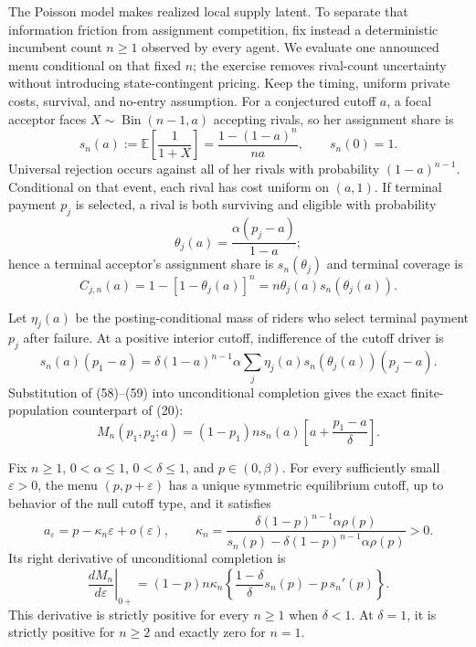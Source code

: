\documentclass[mnsc,blindrev]{informs3}
\newcommand{\E}{\mathbb E}
\begin{document}
The Poisson model makes realized local supply latent.  To separate that
information friction from assignment competition, fix instead a deterministic
incumbent count $n\ge1$ observed by every agent.  We evaluate one announced
menu conditional on that fixed $n$; the exercise removes rival-count
uncertainty without introducing state-contingent pricing.  Keep the timing,
uniform private costs, survival, and no-entry assumption.
For a conjectured cutoff $a$, a focal acceptor faces
$X\sim\operatorname{Bin}(n-1,a)$ accepting rivals, so her assignment share is
\[
 s_n(a):=\E\!\left[\frac1{1+X}\right]
 =\frac{1-(1-a)^n}{na},
 \qquad s_n(0)=1.                                           \tag{57}
\]
Universal rejection occurs against all of her rivals with probability
$(1-a)^{n-1}$.  Conditional on that event, each rival has cost uniform on
$(a,1)$.  If terminal payment $p_j$ is selected, a rival is both surviving
and eligible with probability
\[
 \theta_j(a)=\frac{\alpha(p_j-a)}{1-a};
\]
hence a terminal acceptor's assignment share is $s_n(\theta_j)$ and terminal
coverage is
\[
 C_{j,n}(a)=1-[1-\theta_j(a)]^n
           =n\theta_j(a)s_n(\theta_j(a)).                   \tag{58}
\]

Let $\eta_j(a)$ be the posting-conditional mass of riders who select terminal
payment $p_j$ after failure.  At a positive interior cutoff, indifference of
the cutoff driver is
\[
 s_n(a)(p_1-a)
 =\delta(1-a)^{n-1}\alpha
   \sum_j\eta_j(a)s_n(\theta_j(a))(p_j-a).                  \tag{59}
\]
Substitution of (58)--(59) into unconditional completion gives the exact
finite-population counterpart of (20):
\[
 M_n(p_1,p_2;a)
 =(1-p_1)n s_n(a)\left[a+\frac{p_1-a}\delta\right].       \tag{60}
\]

\begin{proposition}
\label{prop:publicN}
Fix $n\ge1$, $0<\alpha\le1$, $0<\delta\le1$, and
$p\in(0,\beta)$.  For every sufficiently
small $\varepsilon>0$, the menu $(p,p+\varepsilon)$ has a unique symmetric
equilibrium cutoff, up to behavior of the null cutoff type, and it satisfies
\[
 a_\varepsilon=p-\kappa_n\varepsilon+o(\varepsilon),
 \qquad
 \kappa_n=
 \frac{\delta(1-p)^{n-1}\alpha\rho(p)}
 {s_n(p)-\delta(1-p)^{n-1}\alpha\rho(p)}>0.                \tag{61}
\]
Its right derivative of unconditional completion is
\[
 \left.\frac{dM_n}{d\varepsilon}\right|_{0+}
 =(1-p)n\kappa_n
 \left\{\frac{1-\delta}{\delta}s_n(p)-p\,s_n'(p)\right\}. \tag{62}
\]
This derivative is strictly positive for every $n\ge1$ when $\delta<1$.
At $\delta=1$, it is strictly positive for $n\ge2$ and exactly zero for
$n=1$.
\end{proposition}
\end{document}
